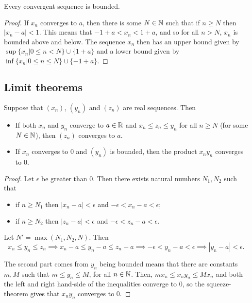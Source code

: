 \begin{theorem}
  Every convergent sequence is bounded.
\end{theorem}

\begin{proof}
  If \(x_{n}\) converges to \(a\), then there is some \(N \in \mathbb{N}\) such that if \(n \geq N\) then \(|x_{n} - a| < 1\). This means that \(-1 + a < x_{n} < 1 + a\), and so for all \(n > N\), \(x_{n}\) is bounded above and below. The sequence \(x_{n}\) then has an upper bound given by \(\sup \{x_{n} | 0 \leq n < N\} \cup \{1 + a\}\) and a lower bound given by \(\inf \{x_{n} | 0 \leq n \leq N\} \cup \{-1 + a\}\).
\end{proof}


\subsection{Limit theorems}

\begin{theorem}\label{thm:real-analysis:squeeze-theorem}
  Suppose that \((x_{n})\), \((y_{n})\) and \((z_{n})\) are real sequences. Then
  \begin{itemize}
  \item If both \(x_{n}\) and \(y_{n}\) converge to \(a \in \mathbb{R}\) and \(x_{n} \leq z_{n} \leq y_{n}\) for all \(n \geq N\) (for some \(N \in \mathbb{N}\)), then \((z_{n})\) converges to \(a\).

  \item If \(x_{n}\) converges to 0 and \((y_{n})\) is bounded, then the product \(x_{n}y_{n}\) converges to 0.
  \end{itemize}
\end{theorem}

\begin{proof}
  Let \(\epsilon\) be greater than 0. Then there exists natural numbers \(N_{1}, N_{2}\) such that
  \begin{itemize}
  \item if \(n \geq N_{1}\) then \(|x_{n} - a | < \epsilon\) and \(-\epsilon < x_{n} - a < \epsilon\);
  \item if \(n \geq N_{2}\) then \(|z_{n} - a | < \epsilon\) and \(-\epsilon < z_{n} - a < \epsilon\).
  \end{itemize}

  Let \(N' = \max(N_{1}, N_{2}, N)\). Then
  \[x_{n} \leq y_{n} \leq z_{n} \implies x_{n} - a \leq y_{n} - a \leq z_{n} - a \implies -\epsilon < y_{n} - a < \epsilon \implies |y_{n} - a | < \epsilon.\]

   The second part comes from \(y_{n}\) being bounded means that there are constants \(m, M\) such that \(m \leq y_{n} \leq M\), for all \(n \in \mathbb{N}\). Then, \(mx_{n} \leq x_{n}y_{n} \leq Mx_{n}\) and both the left and right hand-side of the inequalities converge to 0, so the squeeze-theorem gives that \(x_{n}y_{n}\) converges to 0.
\end{proof}

